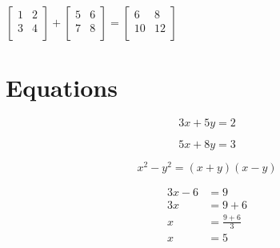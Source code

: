 \documentclass{article}
\begin{document}
    $
    \begin{bmatrix}
        1 & 2 \\
        3 & 4 \\
    \end{bmatrix}
    +
    \begin{bmatrix}
        5 & 6 \\
        7 & 8 \\
    \end{bmatrix}
    =
    \begin{bmatrix}
        6 & 8 \\
        10 & 12 \\
    \end{bmatrix}
    $

    \section{Equations}
    \begin{equation}
        3x + 5y = 2
    \end{equation}
    
    \begin{equation}
        5x + 8y = 3
    \end{equation}

    \begin{equation}
        x^{2} - y^{2} = (x+y)(x-y)
    \end{equation}

    \begin{align}
        3x - 6 &= 9 \\
        3x &= 9 + 6 \nonumber \\
        x &= \frac{9+6}{3} \nonumber \\
        x &= 5 \nonumber
    \end{align}
\end{document}
